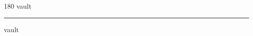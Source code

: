 
\begin{frame}
\begin{center}
\begin{turn}{180}
{\fontsize{2.5cm}{1em}\selectfont vault}
\end{turn}
\vspace{1em}\par  
\hrule
\vspace{1em}\par  
{\fontsize{2.5cm}{1em}\selectfont vault}
\end{center}
\end{frame}

